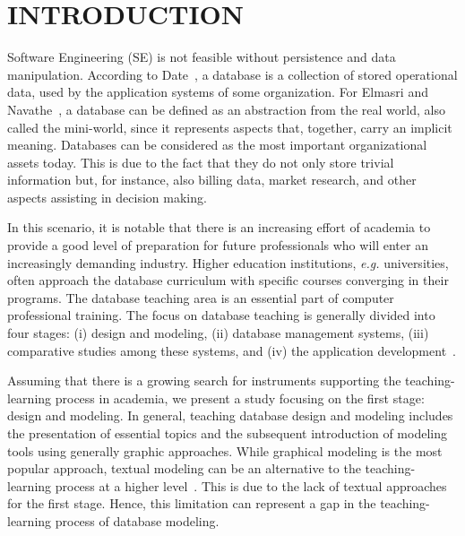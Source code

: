 \documentclass[a4paper,twoside,anonymous]{article}
\begin{document}
\onecolumn \maketitle \normalsize \setcounter{footnote}{0} \vfill

\section{\uppercase{Introduction}} 
\label{sec:introduction}

Software Engineering (SE) is not feasible without persistence and data manipulation.
According to Date~\cite{Date:1990}, a database is a collection of stored operational data, used by the application systems of some organization.
For Elmasri and Navathe~\cite{Elmasri:2015}, a database can be defined as an abstraction from the real world, also called the mini-world, since it represents aspects that, together, carry an implicit meaning.
Databases can be considered as the most important organizational assets today.
This is due to the fact that they do not only store trivial information but, for instance, also billing data, market research, and other aspects assisting in decision making.

In this scenario, it is notable that there is an increasing effort of academia to provide a good level of preparation for future professionals who will enter an increasingly demanding industry. 
Higher education institutions, \textit{e.g.} universities, often approach the database curriculum with specific courses converging in their programs.
The database teaching area is an essential part of computer professional training.
The focus on database teaching is generally divided into four stages: 
(i) design and modeling, 
(ii) database management systems, 
(iii) comparative studies among these systems, and 
(iv) the application development~\cite{Aldmour:2010,Connolly:2006}.

Assuming that there is a growing search for instruments supporting the teaching-learning process in academia, we present a study focusing on the first stage: design and modeling.
In general, teaching database design and modeling includes the presentation of essential topics and the subsequent introduction of modeling tools using generally graphic approaches.
While graphical modeling is the most popular approach, textual modeling can be an alternative to the teaching-learning process at a higher level~\cite{Dimitrieski:2015}. 
This is due to the lack of textual approaches for the first stage. Hence, this limitation can represent a gap in the teaching-learning process of database modeling.
\end{document}
